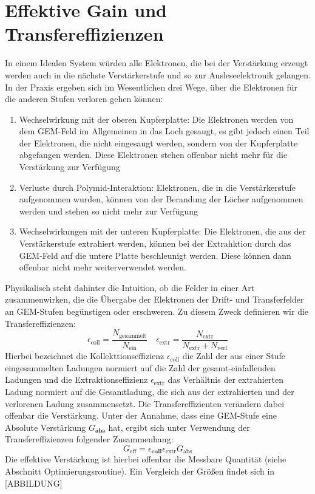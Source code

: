 \section{Effektive Gain und Transfereffizienzen}
In einem Idealen System würden alle Elektronen, die bei der Verstärkung erzeugt werden auch in die nächste Verstärkerstufe und so zur Ausleseelektronik gelangen. In der Praxis ergeben sich im Wesentlichen drei Wege, über die Elektronen für die anderen Stufen verloren gehen können:
\begin{enumerate}
	\item Wechselwirkung mit der oberen Kupferplatte: Die Elektronen werden von dem GEM-Feld im Allgemeinen in das Loch gesaugt, es gibt jedoch einen Teil der Elektronen, die nicht eingesaugt werden, sondern von der Kupferplatte abgefangen werden. Diese Elektronen stehen offenbar nicht mehr für die Verstärkung zur Verfügung
	\item Verluste durch Polymid-Interaktion: Elektronen, die in die Verstärkerstufe aufgenommen wurden, können von der Berandung der Löcher aufgenommen werden und stehen so nicht mehr zur Verfügung
	\item Wechselwirkungen mit der unteren Kupferplatte: Die Elektronen, die aus der Verstärkerstufe extrahiert werden, können bei der Extrahktion durch das GEM-Feld auf die untere Platte beschleunigt werden. Diese können dann offenbar nicht mehr weiterverwendet werden. 
\end{enumerate}
Physikalisch steht dahinter die Intuition, ob die Felder in einer Art zusammenwirken, die die Übergabe der Elektronen der Drift- und Transferfelder an GEM-Stufen begünstigen oder erschweren. Zu diesem Zweck definieren wir die Transfereffizienzen:
\begin{equation*}
	\epsilon_{\text{coll}}=\frac{N_{\text{gesammelt}}}{N_{\text{ein}}} \quad \epsilon_{\text{extr}}=\frac{N_{\text{extr}}}{N_{\text{extr}}+N_{\text{verl}}}
\end{equation*}
Hierbei bezeichnet die Kollekttionseffizienz $\epsilon_{\text{coll}}$ die Zahl der aus einer Stufe eingesammelten Ladungen normiert auf die Zahl der gesamt-einfallenden Ladungen und die Extraktionseffizienz $\epsilon_{\text{extr}}$ das Verhältnis der extrahierten Ladung normiert auf die Gesamtladung, die sich aus der extrahierten und der verlorenen Ladung zusammensetzt. Die Transfereffizienten verändern dabei offenbar die Verstärkung. Unter der Annahme, dass eine GEM-Stufe eine Absolute Verstärkung $G_{\textbf{abs}}$ hat, ergibt sich unter Verwendung der Transfereffizienzen folgender Zusammenhang:
\begin{equation}
	G_{\text{eff}}= \epsilon_{\textbf{coll}} \epsilon_{\text{extr}} G_{\text{abs}}
\end{equation}
Die effektive Verstärkung ist hierbei offenbar die Messbare Quantität (siehe Abschnitt Optimierungsroutine). Ein Vergleich der Größen findet sich in [ABBILDUNG]